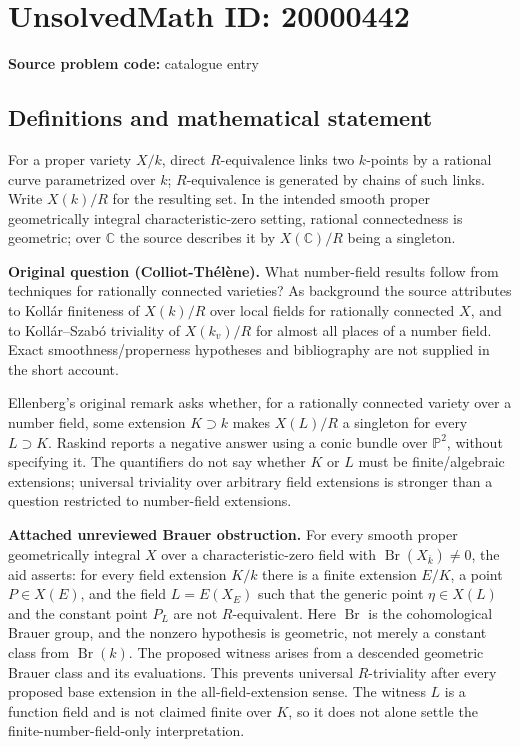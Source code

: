 \documentclass[11pt]{article}
\newcommand{\C}{\mathbb{C}}
\newcommand{\PP}{\mathbb{P}}
\begin{document}
\section*{UnsolvedMath ID: 20000442}
\textbf{Source problem code:} catalogue entry
\subsection{Definitions and mathematical statement}
For a proper variety $X/k$, direct $R$-equivalence links two $k$-points by a rational curve parametrized over $k$; $R$-equivalence is generated by chains of such links. Write $X(k)/R$ for the resulting set. In the intended smooth proper geometrically integral characteristic-zero setting, rational connectedness is geometric; over $\C$ the source describes it by $X(\C)/R$ being a singleton.

\textbf{Original question (Colliot-Thélène).} What number-field results follow from techniques for rationally connected varieties? As background the source attributes to Kollár finiteness of $X(k)/R$ over local fields for rationally connected $X$, and to Kollár--Szabó triviality of $X(k_v)/R$ for almost all places of a number field. Exact smoothness/properness hypotheses and bibliography are not supplied in the short account.

Ellenberg's original remark asks whether, for a rationally connected variety over a number field, some extension $K\supset k$ makes $X(L)/R$ a singleton for every $L\supset K$. Raskind reports a negative answer using a conic bundle over $\PP^2$, without specifying it. The quantifiers do not say whether $K$ or $L$ must be finite/algebraic extensions; universal triviality over arbitrary field extensions is stronger than a question restricted to number-field extensions.

\textbf{Attached unreviewed Brauer obstruction.} For every smooth proper geometrically integral $X$ over a characteristic-zero field with $\operatorname{Br}(X_{\overline k})\ne0$, the aid asserts: for every field extension $K/k$ there is a finite extension $E/K$, a point $P\in X(E)$, and the field $L=E(X_E)$ such that the generic point $\eta\in X(L)$ and the constant point $P_L$ are not $R$-equivalent. Here $\operatorname{Br}$ is the cohomological Brauer group, and the nonzero hypothesis is geometric, not merely a constant class from $\operatorname{Br}(k)$. The proposed witness arises from a descended geometric Brauer class and its evaluations. This prevents universal $R$-triviality after every proposed base extension in the all-field-extension sense. The witness $L$ is a function field and is not claimed finite over $K$, so it does not alone settle the finite-number-field-only interpretation.
\end{document}
